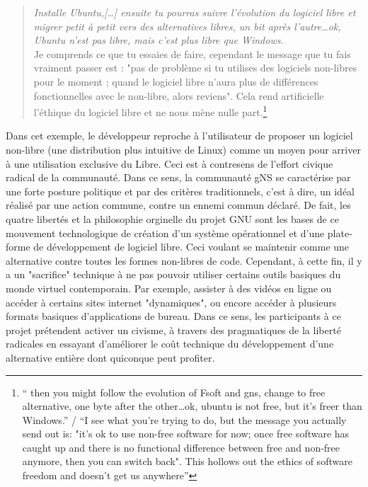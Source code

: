 \begin{quote}
\textit{Installe Ubuntu,[\ldots] ensuite tu pourras suivre l'évolution du logiciel libre et migrer petit à petit vers des alternatives libres, un bit après l'autre\ldots ok, Ubuntu n'est pas libre, mais c'est plus libre que Windows.}\\
Je comprends ce que tu essaies de faire, cependant le message que tu fais vraiment passer est : "pas de problème si tu utilises des logiciels non-libres pour le moment ; quand le logiciel libre n'aura plus de différences fonctionnelles avec le non-libre, alors reviens". Cela rend artificielle l'éthique du logiciel libre et ne nous mène nulle part.\footnote{“ then you might follow the evolution of Fsoft and gns, change to free alternative, one byte after the other\ldots ok, ubuntu is not free, but it's freer than Windows.” / “I see what you're trying to do, but the message you actually send out is: "it's ok to use non-free software for now; once free software has caught up and there is no functional difference between free and non-free anymore, then you can switch back". This hollows out the ethics of software freedom and doesn't get us anywhere”}
\end{quote}

Dans cet exemple, le développeur reproche à l'utilisateur de proposer un logiciel non-libre (une distribution plus intuitive de Linux) comme un moyen pour arriver à une utilisation exclusive du Libre. Ceci est à contresens de l'effort civique radical de la communauté. Dans ce sens, la communauté gNS se caractérise par une forte posture politique et par des critères traditionnels, c'est à dire, un idéal réalisé par une action commune, contre un ennemi commun déclaré. De fait, les quatre libertés et la philosophie orginelle du projet GNU sont les bases de ce mouvement technologique de création d'un système opérationnel et d'une plate-forme de développement de logiciel libre. Ceci voulant se maintenir comme une alternative contre toutes les formes non-libres de code. Cependant, à cette fin, il y a un "sacrifice" technique à ne pas pouvoir utiliser certains outils basiques du monde virtuel contemporain. Par exemple, assister à des vidéos en ligne ou accéder à certains sites internet "dynamiques", ou encore accéder à plusieurs formats basiques d'applications de bureau. Dans ce sens, les participants à ce projet prétendent activer un civisme, à travers des pragmatiques de la liberté radicales en essayant d'améliorer le coût technique du développement d'une alternative entière dont quiconque peut profiter.

